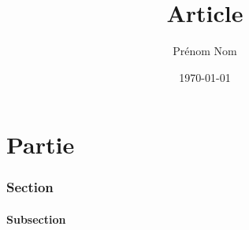 \documentclass[a4paper,11pt]{article}
\title{Article}
\author{Prénom Nom}
\date{\today}
\begin{document}
\maketitle

\part{Partie}
\section{Section}
\subsection{Subsection}
\blindtext
\end{document}
